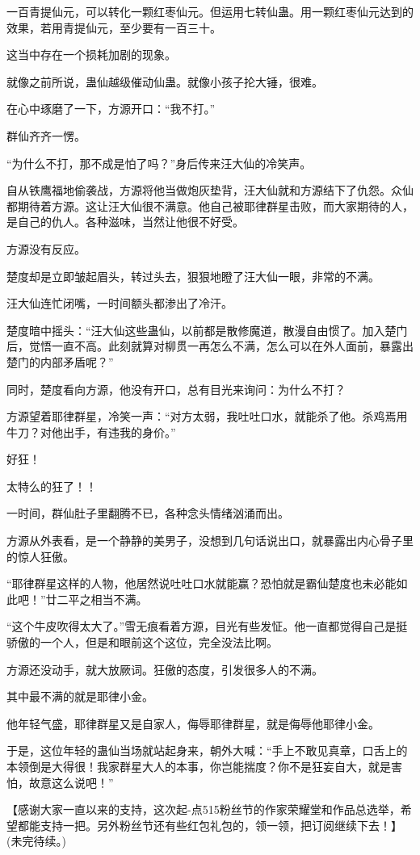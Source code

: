 \begin{this_body}
一百青提仙元，可以转化一颗红枣仙元。但运用七转仙蛊。用一颗红枣仙元达到的效果，若用青提仙元，至少要有一百三十。

这当中存在一个损耗加剧的现象。

就像之前所说，蛊仙越级催动仙蛊。就像小孩子抡大锤，很难。

在心中琢磨了一下，方源开口：“我不打。”

群仙齐齐一愣。

“为什么不打，那不成是怕了吗？”身后传来汪大仙的冷笑声。

自从铁鹰福地偷袭战，方源将他当做炮灰垫背，汪大仙就和方源结下了仇怨。众仙都期待着方源。这让汪大仙很不满意。他自己被耶律群星击败，而大家期待的人，是自己的仇人。各种滋味，当然让他很不好受。

方源没有反应。

楚度却是立即皱起眉头，转过头去，狠狠地瞪了汪大仙一眼，非常的不满。

汪大仙连忙闭嘴，一时间额头都渗出了冷汗。

楚度暗中摇头：“汪大仙这些蛊仙，以前都是散修魔道，散漫自由惯了。加入楚门后，觉悟一直不高。此刻就算对柳贯一再怎么不满，怎么可以在外人面前，暴露出楚门的内部矛盾呢？”

同时，楚度看向方源，他没有开口，总有目光来询问：为什么不打？

方源望着耶律群星，冷笑一声：“对方太弱，我吐吐口水，就能杀了他。杀鸡焉用牛刀？对他出手，有违我的身价。”

好狂！

太特么的狂了！！

一时间，群仙肚子里翻腾不已，各种念头情绪汹涌而出。

方源从外表看，是一个静静的美男子，没想到几句话说出口，就暴露出内心骨子里的惊人狂傲。

“耶律群星这样的人物，他居然说吐吐口水就能赢？恐怕就是霸仙楚度也未必能如此吧！”廿二平之相当不满。

“这个牛皮吹得太大了。”雪无痕看着方源，目光有些发怔。他一直都觉得自己是挺骄傲的一个人，但是和眼前这个这位，完全没法比啊。

方源还没动手，就大放厥词。狂傲的态度，引发很多人的不满。

其中最不满的就是耶律小金。

他年轻气盛，耶律群星又是自家人，侮辱耶律群星，就是侮辱他耶律小金。

于是，这位年轻的蛊仙当场就站起身来，朝外大喊：“手上不敢见真章，口舌上的本领倒是大得很！我家群星大人的本事，你岂能揣度？你不是狂妄自大，就是害怕，故意这么说吧！”

【感谢大家一直以来的支持，这次起-点515粉丝节的作家荣耀堂和作品总选举，希望都能支持一把。另外粉丝节还有些红包礼包的，领一领，把订阅继续下去！】(未完待续。)


\end{this_body}
